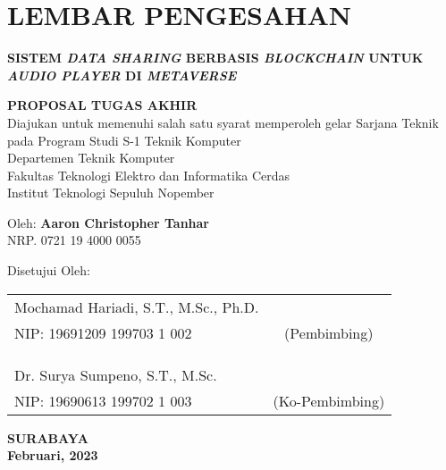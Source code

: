 \chapter*{LEMBAR PENGESAHAN}

\thispagestyle{empty}

\begin{center}
  \textbf{SISTEM \emph{DATA SHARING} BERBASIS \emph{BLOCKCHAIN} UNTUK \emph{AUDIO PLAYER}
    DI \emph{METAVERSE}}
\end{center}

\begingroup
\small

\begin{center}
  \textbf{PROPOSAL TUGAS AKHIR} \\
  Diajukan untuk memenuhi salah satu syarat memperoleh gelar
  Sarjana Teknik pada
  Program Studi S-1 Teknik Komputer \\
  Departemen Teknik Komputer \\
  Fakultas Teknologi Elektro dan Informatika Cerdas \\
  Institut Teknologi Sepuluh Nopember
\end{center}

\begin{center}
  Oleh: \textbf{Aaron Christopher Tanhar} \\
  NRP. 0721 19 4000 0055
\end{center}

\begin{center}
  Disetujui Oleh:
\end{center}

\vspace{10ex}

\begingroup
\setlength{\tabcolsep}{0pt}

\noindent
\begin{tabularx}{\textwidth}{X c}
  Mochamad Hariadi, S.T., M.Sc., Ph.D. &                 \\
  NIP: 19691209 199703 1 002           & (Pembimbing)    \\
                                       &                 \\
                                       &                 \\
                                       &                 \\
  Dr. Surya Sumpeno, S.T., M.Sc.       &                 \\
  NIP: 19690613 199702 1 003           & (Ko-Pembimbing) \\
\end{tabularx}
\endgroup

\vspace{\fill}

\begin{center}
  \textbf{SURABAYA} \\
  \textbf{Februari, 2023}
\end{center}
\endgroup
